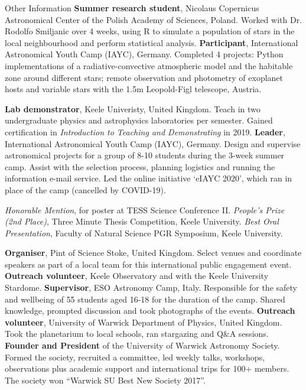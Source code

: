 \begin{rubric}{Other Information}
\entry*[2017]%
    \textbf{Summer research student}, Nicolaus Copernicus Astronomical Center of the Polish Academy of Sciences, Poland. Worked with Dr. Rodolfo Smiljanic over 4 weeks, using R to simulate a population of stars in the local neighbourhood and perform statistical analysis.
\entry*[2014 -- 2017]%
    \textbf{Participant}, International Astronomical Youth Camp (IAYC), Germany. Completed 4 projects: Python implementations of a radiative-convective atmospheric model and the habitable zone around different stars; remote observation and photometry of exoplanet hosts and variable stars with the 1.5m Leopold-Figl telescope, Austria.
    

%
    \textbf{Lab demonstrator}, Keele Univeristy, United Kingdom. Teach in two undergraduate physics and astrophysics laboratories per semester. Gained certification in \emph{Introduction to Teaching and Demonstrating} in 2019.
%
    \textbf{Leader}, International Astronomical Youth Camp (IAYC), Germany. Design and supervise astronomical projects for a group of 8-10 students during the 3-week summer camp. Assist with the selection process, planning logistics and running the information e-mail service. Led the online initiative `eIAYC 2020', which ran in place of the camp (cancelled by COVID-19).

\entry*[2021]
    \textit{Honorable Mention}, for poster at TESS Science Conference II.
\entry*[2021]
    \textit{People's Prize (2nd Place)}, Three Minute Thesis Competition, Keele University.
\entry*[2021]
    \textit{Best Oral Presentation}, Faculty of Natural Science PGR Symposium, Keele University. 

%
    \textbf{Organiser}, Pint of Science Stoke, United Kingdom. Select venues and coordinate speakers as part of a local team for this international public engagement event.
%
    \textbf{Outreach volunteer}, Keele Observatory and with the Keele University Stardome. 
\entry*[2017 -- 2019]%
    \textbf{Supervisor}, ESO Astronomy Camp, Italy. Responsible for the safety and wellbeing of 55 students aged 16-18 for the duration of the camp. Shared knowledge, prompted discussion and took photographs of the events.
\entry*[2017 -- 2018]%
    \textbf{Outreach volunteer}, University of Warwick Department of Physics, United Kingdom. Took the planetarium to local schools, ran stargazing and Q\&A sessions.
\entry*[2016 -- 2018]%
    \textbf{Founder and President} of the University of Warwick Astronomy Society. Formed the society, recruited a committee, led weekly talks, workshops, observations plus academic support and international trips for 100+ members. The society won “Warwick SU Best New Society 2017”.
\end{rubric}